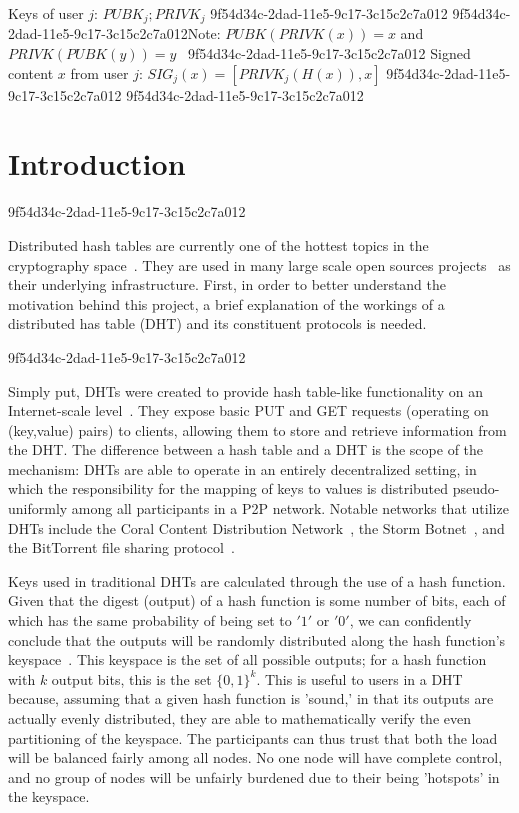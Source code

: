 \documentclass[12pt]{article}
\begin{document}
Keys of user $j$: $ PUBK_j; PRIVK_j $
9f54d34c-2dad-11e5-9c17-3c15c2c7a012
9f54d34c-2dad-11e5-9c17-3c15c2c7a012Note: $PUBK(PRIVK(x)) = x$ and $PRIVK(PUBK(y)) = y$~
9f54d34c-2dad-11e5-9c17-3c15c2c7a012
Signed content $x$ from user $j$: $SIG_j(x) = \left[ PRIVK_j( H(x) ), x \right]$
9f54d34c-2dad-11e5-9c17-3c15c2c7a012
9f54d34c-2dad-11e5-9c17-3c15c2c7a012\section{Introduction}
9f54d34c-2dad-11e5-9c17-3c15c2c7a012\par Distributed hash tables are currently one of the hottest topics in the cryptography space~\cite{Stoica:2001dj,Rowstron:2001ea,Ratnasamy:2001wn}. They are used in many large scale open sources projects~\cite{Freitas:2013tb,Xu:2010vs,Perfitt:2010fh} as their underlying infrastructure. First, in order to better understand the motivation behind this project, a brief explanation of the workings of a distributed has table (DHT) and its constituent protocols is needed.

9f54d34c-2dad-11e5-9c17-3c15c2c7a012\par Simply put, DHTs were created to provide hash table-like functionality on an Internet-scale level~\cite{Ratnasamy:2001wn}. They expose basic PUT and GET requests (operating on (key,value) pairs) to clients, allowing them to store and retrieve information from the DHT. The difference between a hash table and a DHT is the scope of the mechanism: DHTs are able to operate in an entirely decentralized setting, in which the responsibility for the mapping of keys to values is distributed pseudo-uniformly among all participants in a P2P network. Notable networks that utilize DHTs include the Coral Content Distribution Network~\cite{Freedman:2004vb}, the Storm Botnet~\cite{Holz:2008uk}, and the BitTorrent file sharing protocol~\cite{Cohen:y1_8mBnw}.

\par Keys used in traditional DHTs are calculated through the use of a hash function. Given that the digest (output) of a hash function is some number of bits, each of which has the same probability of being set to $'1'$ or $'0'$, we can confidently conclude that the outputs will be randomly distributed along the hash function's keyspace~. This keyspace is the set of all possible outputs; for a hash function with $k$ output bits, this is the set $\{0,1\}^k$. This is useful to users in a DHT because, assuming that a given hash function is 'sound,' in that its outputs are actually evenly distributed, they are able to mathematically verify the even partitioning of the keyspace. The participants can thus trust that both the load will be balanced fairly among all nodes. No one node will have complete control, and no group of nodes will be unfairly burdened due to their being 'hotspots' in the keyspace.~
\end{document}
